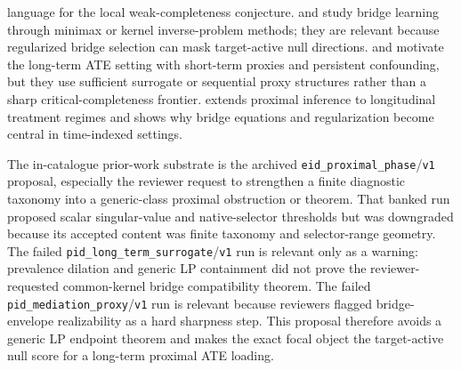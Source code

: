 \documentclass[11pt]{article}
\theoremstyle{definition}
\theoremstyle{plain}
\theoremstyle{remark}
\begin{document}
language for the local weak-completeness conjecture.  \citet[Abstract and
Section 4's minimax bridge-learning construction]{KallusMaoUehara2021} and
\citet{MastouriZhuGultchinEtAl2021} study bridge learning through minimax or
kernel inverse-problem methods; they are relevant because regularized bridge
selection can mask target-active null directions.  \citet{AtheyChettyImbensKang2019}
and \citet{ImbensKallusMaoWang2025} motivate the long-term ATE setting with
short-term proxies and persistent confounding, but they use sufficient surrogate
or sequential proxy structures rather than a sharp critical-completeness
frontier.  \citet{YingMiaoShiTchetgen2023} extends proximal inference to
longitudinal treatment regimes and shows why bridge equations and
regularization become central in time-indexed settings.

The in-catalogue prior-work substrate is the archived
\texttt{eid\_proximal\_phase}/\texttt{v1} proposal, especially the reviewer
request to strengthen a finite diagnostic taxonomy into a generic-class
proximal obstruction or theorem.  That banked run proposed scalar singular-value
and native-selector thresholds but was downgraded because its accepted content
was finite taxonomy and selector-range geometry.  The failed
\texttt{pid\_long\_term\_surrogate}/\texttt{v1} run is relevant only as a
warning: prevalence dilation and generic LP containment did not prove the
reviewer-requested common-kernel bridge compatibility theorem.  The failed
\texttt{pid\_mediation\_proxy}/\texttt{v1} run is relevant because reviewers
flagged bridge-envelope realizability as a hard sharpness step.  This proposal
therefore avoids a generic LP endpoint theorem and makes the exact focal object
the target-active null score for a long-term proximal ATE loading.
\end{document}
